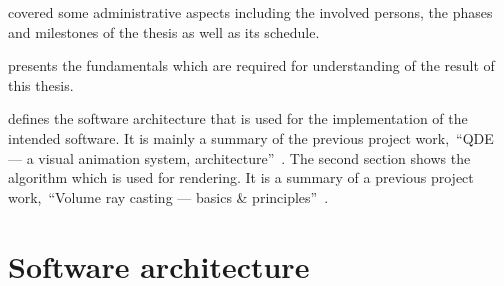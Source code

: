 \documentclass[%
    a4paper,
    nobib,   %
    openany  %
]{tufte-book}
\begin{document}
 covered some administrative aspects including the
involved persons, the phases and milestones of the thesis as well as its
schedule.

 presents the fundamentals which are required for
understanding of the result of this thesis.

 defines the software architecture
that is used for the implementation of the intended software. It is mainly a
summary of the previous project work,~\enquote{QDE --- a visual animation
system, architecture}~\cite{osterwalder_qde_2016}. The second section shows the
algorithm which is used for rendering. It is a summary of a previous project
work,~\enquote{Volume ray casting --- basics \&
principles}~\cite{osterwalder_volume_2016}.

\section{Software architecture}
\label{sec:architecture}
\end{document}

